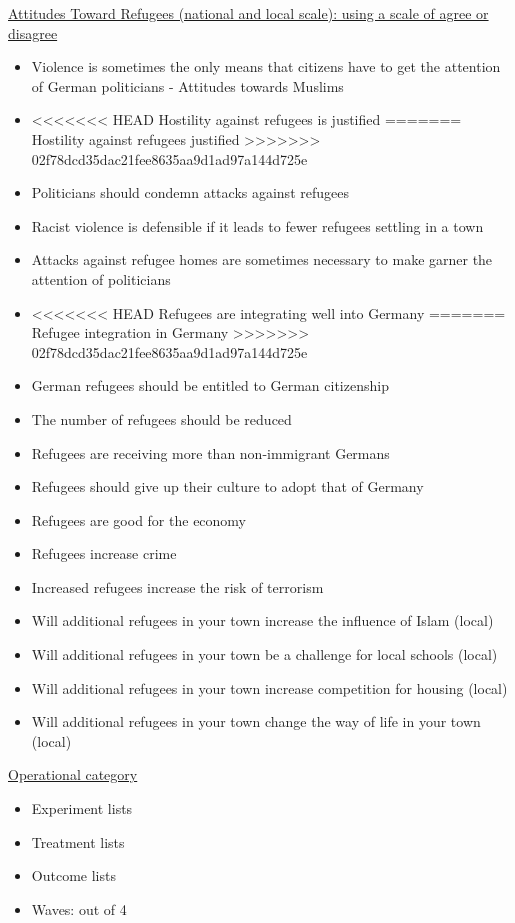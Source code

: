 \documentclass[
]{article}
\begin{document}
\uline{Attitudes Toward Refugees (national and local scale): using a
scale of agree or disagree}

\begin{itemize}
\item
  Violence is sometimes the only means that citizens have to get the
  attention of German politicians - Attitudes towards Muslims
\item
<<<<<<< HEAD
  Hostility against refugees is justified
=======
  Hostility against refugees justified
>>>>>>> 02f78dcd35dac21fee8635aa9d1ad97a144d725e
\item
  Politicians should condemn attacks against refugees
\item
  Racist violence is defensible if it leads to fewer refugees settling
  in a town
\item
  Attacks against refugee homes are sometimes necessary to make garner
  the attention of politicians
\item
<<<<<<< HEAD
  Refugees are integrating well into Germany
=======
  Refugee integration in Germany
>>>>>>> 02f78dcd35dac21fee8635aa9d1ad97a144d725e
\item
  German refugees should be entitled to German citizenship
\item
  The number of refugees should be reduced
\item
  Refugees are receiving more than non-immigrant Germans
\item
  Refugees should give up their culture to adopt that of Germany
\item
  Refugees are good for the economy
\item
  Refugees increase crime
\item
  Increased refugees increase the risk of terrorism
\item
  Will additional refugees in your town increase the influence of Islam
  (local)
\item
  Will additional refugees in your town be a challenge for local schools
  (local)
\item
  Will additional refugees in your town increase competition for housing
  (local)
\item
  Will additional refugees in your town change the way of life in your
  town (local)
\end{itemize}

\uline{Operational category}

\begin{itemize}
\item
  Experiment lists
\item
  Treatment lists
\item
  Outcome lists
\item
  Waves: out of 4
\end{itemize}
\end{document}
